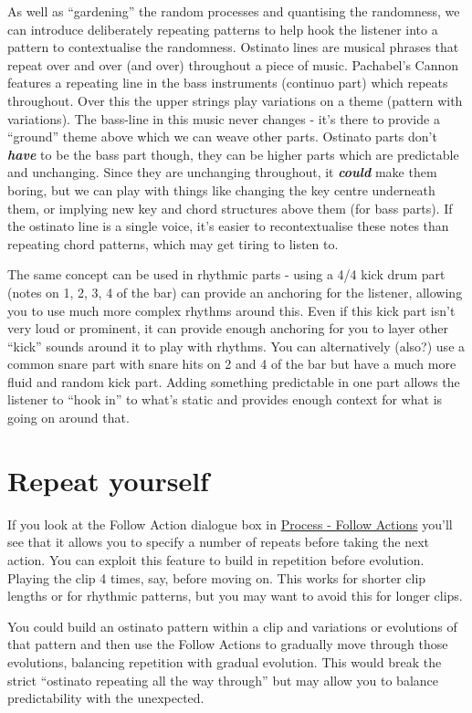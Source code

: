 \documentclass[
  12pt,
  letterpaper,
  oneside,
  open=any]{scrbook}
\begin{document}
As well as ``gardening'' the random processes and quantising the
randomness, we can introduce deliberately repeating patterns to help
hook the listener into a pattern to contextualise the randomness.
Ostinato lines are musical phrases that repeat over and over (and over)
throughout a piece of music. Pachabel's Cannon features a repeating line
in the bass instruments (continuo part) which repeats throughout. Over
this the upper strings play variations on a theme (pattern with
variations). The bass-line in this music never changes - it's there to
provide a ``ground'' theme above which we can weave other parts.
Ostinato parts don't \textbf{\emph{have}} to be the bass part though,
they can be higher parts which are predictable and unchanging. Since
they are unchanging throughout, it \textbf{\emph{could}} make them
boring, but we can play with things like changing the key centre
underneath them, or implying new key and chord structures above them
(for bass parts). If the ostinato line is a single voice, it's easier to
recontextualise these notes than repeating chord patterns, which may get
tiring to listen to.

The same concept can be used in rhythmic parts - using a 4/4 kick drum
part (notes on 1, 2, 3, 4 of the bar) can provide an anchoring for the
listener, allowing you to use much more complex rhythms around this.
Even if this kick part isn't very loud or prominent, it can provide
enough anchoring for you to layer other ``kick'' sounds around it to
play with rhythms. You can alternatively (also?) use a common snare part
with snare hits on 2 and 4 of the bar but have a much more fluid and
random kick part. Adding something predictable in one part allows the
listener to ``hook in'' to what's static and provides enough context for
what is going on around that.

\section{Repeat yourself}\label{repeat-yourself}

If you look at the Follow Action dialogue box in
\hyperref[003-Process-Follow_Actions]{Process - Follow Actions} you'll
see that it allows you to specify a number of repeats before taking the
next action. You can exploit this feature to build in repetition before
evolution. Playing the clip 4 times, say, before moving on. This works
for shorter clip lengths or for rhythmic patterns, but you may want to
avoid this for longer clips.

You could build an ostinato pattern within a clip and variations or
evolutions of that pattern and then use the Follow Actions to gradually
move through those evolutions, balancing repetition with gradual
evolution. This would break the strict ``ostinato repeating all the way
through'' but may allow you to balance predictability with the
unexpected.
\end{document}
